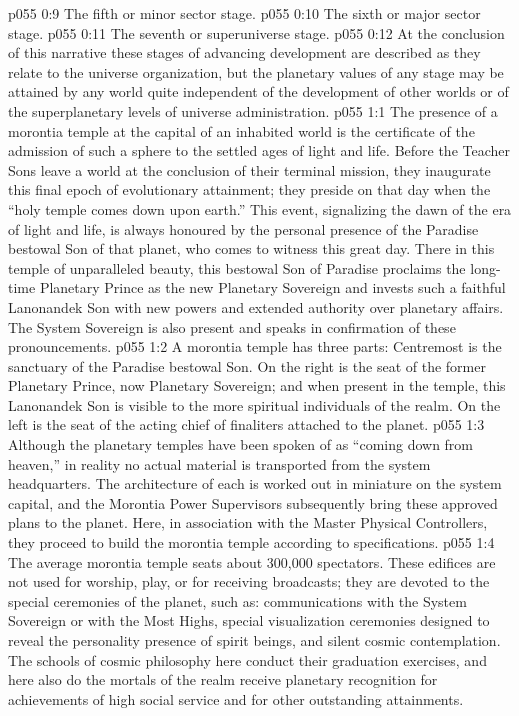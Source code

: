 \vs p055 0:9 \bibnobreakspace The fifth or minor sector stage.
\vs p055 0:10 \bibnobreakspace The sixth or major sector stage.
\vs p055 0:11 \bibnobreakspace The seventh or superuniverse stage.
\vs p055 0:12 \pc At the conclusion of this narrative these stages of advancing development are described as they relate to the universe organization, but the planetary values of any stage may be attained by any world quite independent of the development of other worlds or of the superplanetary levels of universe administration.
\vs p055 1:1 The presence of a morontia temple at the capital of an inhabited world is the certificate of the admission of such a sphere to the settled ages of light and life. Before the Teacher Sons leave a world at the conclusion of their terminal mission, they inaugurate this final epoch of evolutionary attainment; they preside on that day when the “holy temple comes down upon earth.” This event, signalizing the dawn of the era of light and life, is always honoured by the personal presence of the Paradise bestowal Son of that planet, who comes to witness this great day. There in this temple of unparalleled beauty, this bestowal Son of Paradise proclaims the long\hyp{}time Planetary Prince as the new Planetary Sovereign and invests such a faithful Lanonandek Son with new powers and extended authority over planetary affairs. The System Sovereign is also present and speaks in confirmation of these pronouncements.
\vs p055 1:2 A morontia temple has three parts: Centremost is the sanctuary of the Paradise bestowal Son. On the right is the seat of the former Planetary Prince, now Planetary Sovereign; and when present in the temple, this Lanonandek Son is visible to the more spiritual individuals of the realm. On the left is the seat of the acting chief of finaliters attached to the planet.
\vs p055 1:3 \pc Although the planetary temples have been spoken of as “coming down from heaven,” in reality no actual material is transported from the system headquarters. The architecture of each is worked out in miniature on the system capital, and the Morontia Power Supervisors subsequently bring these approved plans to the planet. Here, in association with the Master Physical Controllers, they proceed to build the morontia temple according to specifications.
\vs p055 1:4 \pc The average morontia temple seats about 300,000 spectators. These edifices are not used for worship, play, or for receiving broadcasts; they are devoted to the special ceremonies of the planet, such as: communications with the System Sovereign or with the Most Highs, special visualization ceremonies designed to reveal the personality presence of spirit beings, and silent cosmic contemplation. The schools of cosmic philosophy here conduct their graduation exercises, and here also do the mortals of the realm receive planetary recognition for achievements of high social service and for other outstanding attainments.
